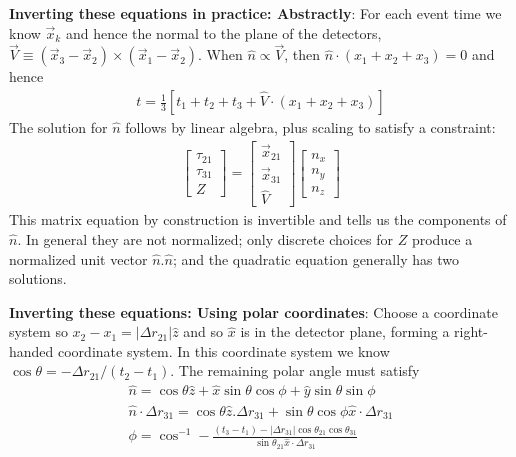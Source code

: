 \documentclass[twocolumn,prd,nofootinbib]{revtex4}
\begin{document}
\begin{widetext}
\begin{shaded}
\noindent \textbf{Inverting these equations in practice: Abstractly}: For each event time we know $\vec{x}_k$ and hence the normal
to the plane of the detectors, $\vec{V}\equiv (\vec{x}_3 -\vec{x}_2)\times(\vec{x}_1-\vec{x}_2)$.  When $\hat{n}\propto
\vec{V}$, then $\hat{n}\cdot (x_1+x_2+x_3)=0$ and hence
\begin{eqnarray}
t = \frac{1}{3}[t_1+t_2+t_3 + \hat{V}\cdot(x_1+x_2+x_3)] 
\end{eqnarray}
The solution for $\hat{n}$ follows by linear algebra, plus scaling to satisfy a constraint:
\begin{eqnarray}
\begin{bmatrix}
\tau_{21} \\ \tau_{31} \\ Z
\end{bmatrix}
=
\begin{bmatrix}
\vec{x}_{21} \\ \vec{x}_{31} \\  \hat{V}
\end{bmatrix}
\begin{bmatrix}
n_x \\ n_y \\ n_z
\end{bmatrix}
\end{eqnarray}
This matrix equation by construction is invertible and tells us the components of $\hat{n}$.  In general they are not
normalized; only discrete choices for $Z$ produce a normalized unit vector $\hat{n}.\hat{n}$; and the quadratic equation
generally has two solutions.

\noindent \textbf{Inverting these equations: Using polar coordinates}: Choose a coordinate system so $x_2-x_1 =|\Delta
r_{21}| \hat{z}$ and so $\hat{x}$ is in the detector plane, forming a right-handed coordinate system.  In this coordinate system we know $\cos \theta = -\Delta r_{21}/(t_2-t_1)$.  The remaining polar angle
must satisfy 
\begin{eqnarray}
\hat{n} = \cos \theta \hat{z} + \hat{x}\sin\theta \cos \phi + \hat{y} \sin\theta \sin\phi \\
\hat{n}\cdot \Delta r_{31} =  \cos \theta \hat{z}.\Delta r_{31} + \sin \theta \cos \phi \hat{x} \cdot \Delta r_{31} \\
\phi = \cos^{-1} - \frac{(t_3-t_1)  - |\Delta r_{31}| \cos \theta_{21}\cos \theta_{31} }{ \sin \theta_{21}  \hat{x}\cdot
  \Delta r_{31}}
\end{eqnarray}


\end{shaded}
\end{widetext}
\end{document}
